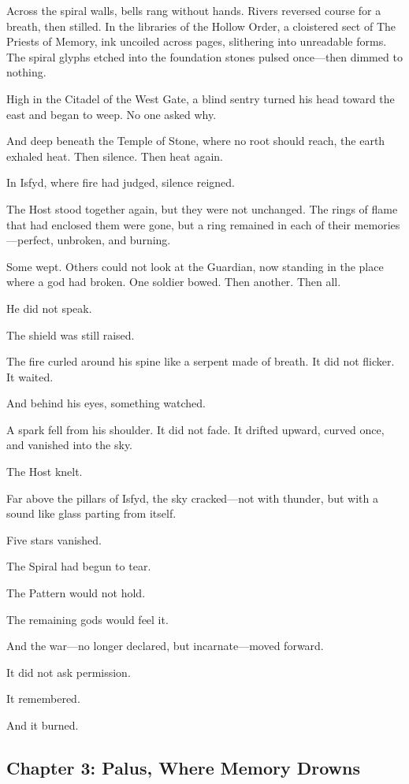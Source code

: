 \documentclass[12pt]{article}
\begin{document}
Across the spiral walls, bells rang without hands. Rivers reversed course for a breath, then stilled. In the libraries of the Hollow Order, a cloistered sect of The Priests of Memory, ink uncoiled across pages, slithering into unreadable forms. The spiral glyphs etched into the foundation stones pulsed once—then dimmed to nothing.

High in the Citadel of the West Gate, a blind sentry turned his head toward the east and began to weep. No one asked why.

And deep beneath the Temple of Stone, where no root should reach, the earth exhaled heat. Then silence. Then heat again.

In Isfyd, where fire had judged, silence reigned.

The Host stood together again, but they were not unchanged. The rings of flame that had enclosed them were gone, but a ring remained in each of their memories—perfect, unbroken, and burning.

Some wept. Others could not look at the Guardian, now standing in the place where a god had broken. One soldier bowed. Then another. Then all.

He did not speak.

The shield was still raised.

The fire curled around his spine like a serpent made of breath. It did not flicker. It waited.

And behind his eyes, something watched.

A spark fell from his shoulder. It did not fade. It drifted upward, curved once, and vanished into the sky.

The Host knelt.

Far above the pillars of Isfyd, the sky cracked—not with thunder, but with a sound like glass parting from itself.

Five stars vanished.

The Spiral had begun to tear.

The Pattern would not hold.

The remaining gods would feel it.

And the war—no longer declared, but incarnate—moved forward.

It did not ask permission.

It remembered.

And it burned.

\newpage

\subsection{Chapter 3: Palus, Where Memory Drowns}
\end{document}
